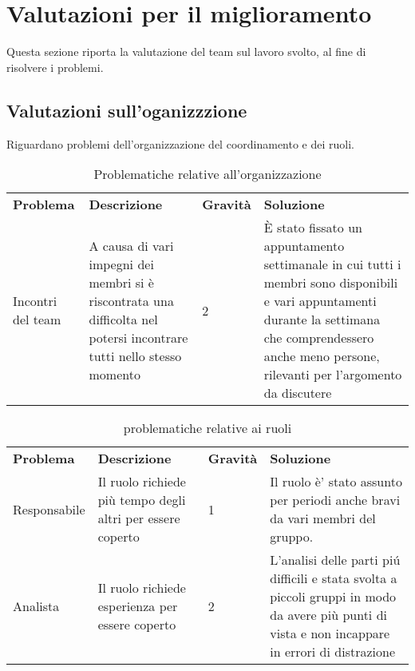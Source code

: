 \section{Valutazioni per il miglioramento}
Questa sezione riporta la valutazione del team sul lavoro svolto, al fine di risolvere i problemi.

\subsection{Valutazioni sull'oganizzzione}
Riguardano problemi dell'organizzazione del coordinamento e dei ruoli.

\begin{center}
    \centering
    \renewcommand{\arraystretch}{1.8}
    \label{tab:ValutazioneOrganizzazione}
    \begin{longtable}[!h]{p{60px} p{150px} p{50px} p{150px}}
        \caption{Problematiche relative all'organizzazione}\\           
        \rowcolor{logo!70}   \textbf{Problema} & \textbf{Descrizione} & \textbf{Gravit\`a} & \textbf{Soluzione} \\
        Incontri del team & A causa di vari impegni dei membri si \`e riscontrata una difficolta nel potersi incontrare tutti nello stesso momento & 2 & \`E stato fissato un appuntamento settimanale in cui tutti i membri sono disponibili e vari appuntamenti durante la settimana che comprendessero anche meno persone, rilevanti per l'argomento da discutere\\
    \end{longtable}    
\end{center}

\begin{center}
    \centering
    \renewcommand{\arraystretch}{1.8}
    \label{tab:ValutazioneRuoli}
    \begin{longtable}[!h]{p{60px} p{150px} p{50px} p{150px}}
        \caption{problematiche relative ai ruoli}\\      
        \rowcolor{logo!70}   \textbf{Problema} & \textbf{Descrizione} & \textbf{Gravit\`a} & \textbf{Soluzione} \\
        Responsabile & Il ruolo richiede pi\`u tempo degli altri per essere coperto & 1 & Il ruolo \`e' stato assunto per periodi anche bravi da vari membri del gruppo. \\
        Analista & Il ruolo richiede esperienza per essere coperto & 2 & L'analisi delle parti pi\'u difficili e stata svolta a piccoli gruppi in modo da avere pi\`u punti di vista e non incappare in errori di distrazione \\
    \end{longtable}    
\end{center}

